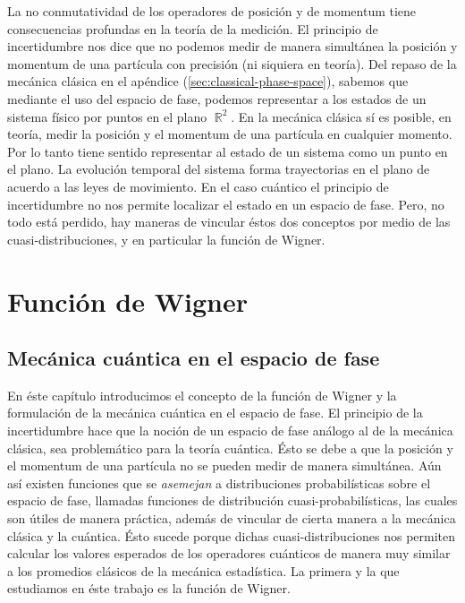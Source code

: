 \documentclass[a4paper,11pt]{report}
\DeclareMathOperator{\R}{\mathbb{R}}
\begin{document}
  La no conmutatividad de los operadores de posición y de
  momentum tiene consecuencias profundas en la teoría de la
  medición.  El principio de incertidumbre nos dice que no
  podemos medir de manera simultánea la posición y momentum
  de una partícula con precisión (ni siquiera en teoría).
  Del repaso de la mecánica clásica en el apéndice
  (\ref{sec:classical-phase-space}), sabemos
  que mediante el uso del espacio de fase, podemos
  representar a los estados de un sistema físico por puntos
  en el plano $\R^2$. En la mecánica clásica sí es posible,
  en teoría, medir la posición y el momentum de una
  partícula en cualquier momento. Por lo tanto tiene sentido
  representar al estado de un sistema como un punto en el
  plano. La evolución temporal del sistema forma
  trayectorias en el plano de acuerdo a las leyes de
  movimiento. En el caso cuántico el principio de
  incertidumbre no nos permite localizar el estado en un
  espacio de fase. Pero, no todo está perdido, hay maneras
  de vincular éstos dos conceptos por medio de las
  cuasi-distribuciones, y en particular la función de
  Wigner.

  \chapter{Función de Wigner}

  \section{Mecánica cuántica en el espacio de fase}

  En éste capítulo introducimos el concepto de la función de
  Wigner y la formulación de la mecánica cuántica en el
  espacio de fase. El principio de la incertidumbre hace que
  la noción de un espacio de fase análogo al de la
  mecánica clásica, sea problemático para la teoría
  cuántica. Ésto se debe a que la posición y el momentum de
  una partícula no se pueden medir de manera simultánea.
  Aún así existen funciones que se \textit{asemejan} a
  distribuciones probabilísticas sobre el espacio de fase,
  llamadas funciones de distribución cuasi-probabilísticas,
  las cuales son útiles de manera práctica, además de
  vincular de cierta manera a la mecánica clásica y la
  cuántica. Ésto sucede porque dichas cuasi-distribuciones
  nos permiten calcular los valores esperados de los
  operadores cuánticos de manera muy similar a los promedios
  clásicos de la mecánica estadística. La primera y la que
  estudiamos en éste trabajo es la función de Wigner.
\end{document}

